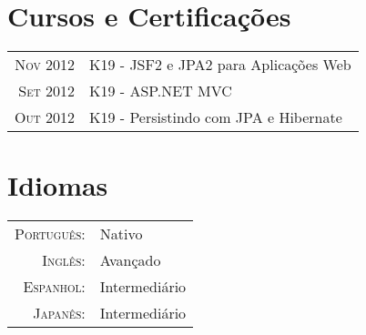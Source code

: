 \documentclass[a4paper,10pt]{article}
\begin{document}
\section{Cursos e Certificações}
\begin{tabular}{rl}
 \textsc{Nov} 2012 & K19 - JSF2 e JPA2 para Aplicações Web\\
\textsc{Set} 2012 & K19 - ASP.NET MVC\\
\textsc{Out} 2012 & K19 - Persistindo com JPA e Hibernate\\
\end{tabular}

\section{Idiomas}
\begin{tabular}{rl}
 \textsc{Português:}&Nativo\\
\textsc{Inglês:}&Avançado\\
\textsc{Espanhol:}&Intermediário\\
\textsc{Japanês:}&Intermediário\\
\end{tabular}

\end{document}
